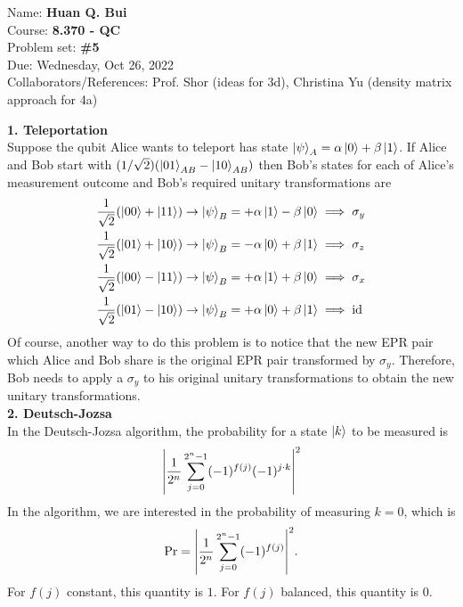 \documentclass{article}
\theoremstyle{definition}
\newcommand{\al}{\alpha}
\newcommand{\be}{\beta}
\newcommand{\f}[2]{\frac{#1}{#2}}
\begin{document}
\begin{framed}
\noindent Name: \textbf{Huan Q. Bui}\\
Course: \textbf{8.370 - QC}\\
Problem set: \textbf{\#5}\\
Due: Wednesday, Oct 26, 2022\\
Collaborators/References: Prof. Shor (ideas for 3d), Christina Yu (density matrix approach for 4a)
\end{framed}




\noindent \textbf{1. Teleportation} \\

\noindent Suppose the qubit Alice wants to teleport has state $\ket{\psi}_A = \al\ket{0}+ \be\ket{1}$. If Alice and Bob start with $(1/\sqrt{2})(\ket{01}_{AB} - \ket{10}_{AB})$ then Bob's states for each of Alice's measurement outcome and Bob's required unitary transformations are
\begin{align*}
	&\f{1}{\sqrt{2}}(\ket{00} + \ket{11}) \to \ket{\psi}_B = +\al\ket{1} - \be\ket{0} \implies \sigma_y\\
	&\f{1}{\sqrt{2}}(\ket{01} + \ket{10}) \to \ket{\psi}_B = -\al\ket{0} + \be\ket{1} \implies \sigma_z \\
	&\f{1}{\sqrt{2}}(\ket{00} - \ket{11}) \to \ket{\psi}_B = +\al\ket{1} + \be\ket{0} \implies \sigma_x\\
	&\f{1}{\sqrt{2}}(\ket{01} - \ket{10}) \to \ket{\psi}_B = +\al\ket{0} + \be\ket{1} \implies \text{id}\\
\end{align*}
Of course, another way to do this problem is to notice that the new EPR pair which Alice and Bob share is the original EPR pair transformed by $\sigma_y$. Therefore, Bob needs to apply a $\sigma_y$ to his original unitary transformations to obtain the new unitary transformations. \\



\noindent \textbf{2. Deutsch-Jozsa}\\ 


In the Deutsch-Jozsa algorithm, the probability for a state $\ket{k}$ to be measured is 
\begin{align*}
	\abs{\f{1}{2^n} \sum^{2^n-1}_{j=0}  (-1)^{f(j)}  (-1)^{j\cdot k} }^2
\end{align*}
In the algorithm, we are interested in the probability of measuring $k=0$, which is 
\begin{align*}
	\Pr = \abs{\f{1}{2^n} \sum^{2^n-1}_{j=0}  (-1)^{f(j)}}^2.
\end{align*}
For $f(j)$ constant, this quantity is $1$. For $f(j)$ balanced, this quantity is $0$. \\
\end{document}
